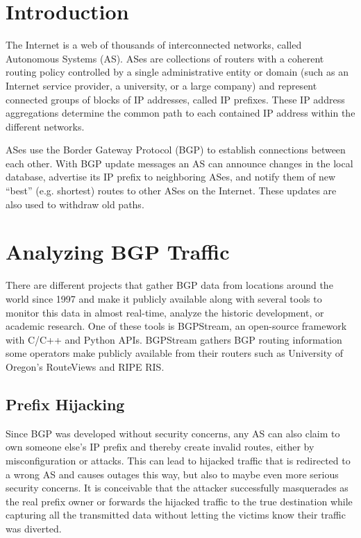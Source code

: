 \section{Introduction}
The Internet is a web of thousands of interconnected networks, called
Autonomous Systems (AS). ASes are collections of routers with a coherent
routing policy controlled by a single administrative entity or domain
(such as an Internet service provider, a university, or a large company)
and represent connected groups of blocks of IP addresses, called IP
prefixes. These IP address aggregations determine the common path to
each contained IP address within the different networks.

ASes use the Border Gateway Protocol (BGP) to establish connections
between each other. With BGP update messages an AS can announce changes
in the local database, advertise its IP prefix to neighboring ASes, and
notify them of new ``best'' (e.g. shortest) routes to other ASes on the
Internet. These updates are also used to withdraw old paths.

\section{Analyzing BGP Traffic}
There are different projects that gather BGP data from locations around
the world since 1997 and make it publicly available along with several
tools to monitor this data in almost real-time, analyze the historic
development, or academic research. One of these tools is BGPStream, an
open-source framework with C/C++ and Python APIs. BGPStream gathers BGP
routing information some operators make publicly available from their
routers such as University of Oregon's RouteViews and RIPE RIS.

\subsection{Prefix Hijacking}
Since BGP was developed without security concerns, any AS can also claim
to own someone else’s IP prefix and thereby create invalid routes,
either by misconfiguration or attacks. This can lead to hijacked traffic
that is redirected to a wrong AS and causes outages this way, but also
to maybe even more serious security concerns. It is conceivable that the
attacker successfully masquerades as the real prefix owner or forwards
the hijacked traffic to the true destination while capturing all the
transmitted data without letting the victims know their traffic was
diverted.

